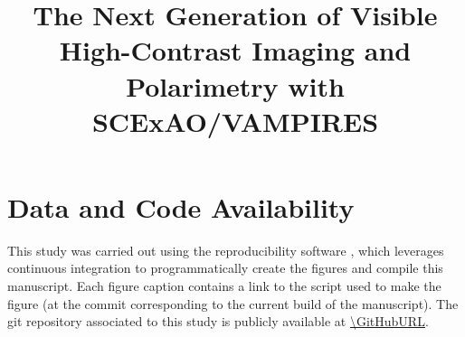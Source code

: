 \documentclass[twocolumn]{aastex631}
\begin{document}
\title{The Next Generation of Visible High-Contrast Imaging and Polarimetry with SCExAO/VAMPIRES}




% 


% 










\software{}



\appendix






\section{Data and Code Availability}
This study was carried out using the reproducibility software \href{https://github.com/showyourwork/showyourwork}{\showyourwork} \citep{luger_mapping_2021}, which leverages continuous integration to programmatically create the figures and compile this manuscript. Each figure caption contains a link to the script used to make the figure (at the commit corresponding to the current build of the manuscript). The git repository associated to this study is publicly available at \url{\GitHubURL}.
\end{document}
